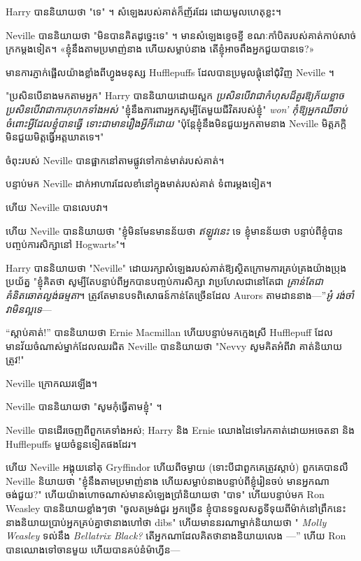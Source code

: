 {{{{Harry បាននិយាយថា "ទេ" ។ សំឡេង​របស់​គាត់​ក៏​ញ័រ​ដែរ ដោយ​មូលហេតុ​ខ្លះ។

Neville បាននិយាយថា "មិនបានគិតដូច្នេះទេ" ។ មាន​សំឡេង​ខ្ទេចខ្ទី ខណៈ​កាំបិត​របស់គាត់​កាប់​សាច់ក្រក​ម្តងទៀត។ «ខ្ញុំ​នឹង​តាម​ប្រមាញ់​នាង ហើយ​សម្លាប់​នាង តើ​ខ្ញុំ​អាច​ពឹង​អ្នក​ជួយ​បាន​ទេ?»

មានការភ្ញាក់ផ្អើលយ៉ាងខ្លាំងពីហ្វូងមនុស្ស Hufflepuffs ដែលបានប្រមូលផ្តុំនៅជុំវិញ Neville ។

"ប្រសិនបើនាងមកតាមអ្នក" Harry បាននិយាយដោយស្អក \emph{ប្រសិនបើវាជាកំហុសដ៏គួរឱ្យភ័យខ្លាច ប្រសិនបើវាជាការកុហកទាំងអស់} "ខ្ញុំនឹងការពារអ្នកសូម្បីតែមួយជីវិតរបស់ខ្ញុំ" \emph{won' កុំឱ្យអ្នកឈឺចាប់ចំពោះអ្វីដែលខ្ញុំបានធ្វើ ទោះជាមានរឿងអ្វីក៏ដោយ} "ប៉ុន្តែខ្ញុំនឹងមិនជួយអ្នកតាមនាង Neville មិត្តភក្តិមិនជួយមិត្តធ្វើអត្តឃាតទេ។"

ចំពុះរបស់ Neville បានផ្អាកនៅតាមផ្លូវទៅកាន់មាត់របស់គាត់។

បន្ទាប់មក Neville ដាក់អាហារដែលខាំនៅក្នុងមាត់របស់គាត់ ទំពារម្តងទៀត។

ហើយ Neville បានលេបវា។

ហើយ Neville បាននិយាយថា "ខ្ញុំមិនមែនមានន័យថា \emph{ឥឡូវនេះ} ទេ ខ្ញុំមានន័យថា បន្ទាប់ពីខ្ញុំបានបញ្ចប់ការសិក្សានៅ Hogwarts"។

Harry បាននិយាយថា "Neville" ដោយរក្សាសំឡេងរបស់គាត់ឱ្យស្ថិតក្រោមការគ្រប់គ្រងយ៉ាងប្រុងប្រយ័ត្ន "ខ្ញុំគិតថា សូម្បីតែបន្ទាប់ពីអ្នកបានបញ្ចប់ការសិក្សា វាប្រហែលជានៅតែជា \emph{គ្រាន់តែជាគំនិតឆោតល្ងង់ធម្មតា}។ ត្រូវតែមានបទពិសោធន៍កាន់តែច្រើនដែល Aurors តាមដាននាង—”\emph{អូ៎ រង់ចាំ វាមិនល្អទេ}—

“ស្តាប់គាត់!” បាននិយាយថា Ernie Macmillan ហើយបន្ទាប់មកក្មេងស្រី Hufflepuff ដែលមានវ័យចំណាស់ម្នាក់ដែលឈរជិត Neville បាននិយាយថា "Nevvy សូមគិតអំពីវា គាត់និយាយត្រូវ!"

Neville ក្រោកឈរឡើង។

Neville បាននិយាយថា "សូមកុំធ្វើតាមខ្ញុំ" ។

Neville បានដើរចេញពីពួកគេទាំងអស់; Harry និង Ernie ឈោងដៃទៅរកគាត់ដោយអចេតនា និង Hufflepuffs មួយចំនួនទៀតផងដែរ។

ហើយ Neville អង្គុយនៅតុ Gryffindor ហើយពីចម្ងាយ (ទោះបីជាពួកគេត្រូវស្តាប់) ពួកគេបានលឺ Neville និយាយថា "ខ្ញុំនឹងតាមប្រមាញ់នាង ហើយសម្លាប់នាងបន្ទាប់ពីខ្ញុំរៀនចប់ មានអ្នកណាចង់ជួយ?" ហើយយ៉ាងហោចណាស់មានសំឡេងប្រាំនិយាយថា "បាទ" ហើយបន្ទាប់មក Ron Weasley បាននិយាយខ្លាំងៗថា "ចូលតម្រង់ជួរ អ្នកច្រើន ខ្ញុំបានទទួលសត្វទីទុយពីម៉ាក់នៅព្រឹកនេះ នាងនិយាយប្រាប់អ្នកគ្រប់គ្នាថានាងហៅថា dibs" ហើយមាននរណាម្នាក់និយាយថា "\emph{ Molly Weasley} ទល់នឹង \emph{Bellatrix Black?} តើអ្នកណាដែលគិតថានាងនិយាយលេង —” ហើយ Ron បានឈោងទៅចានមួយ ហើយបានគប់នំម៉ាហ្វីន—

}}}}
